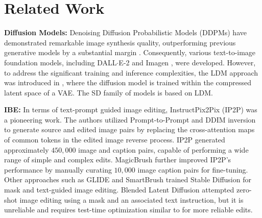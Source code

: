 \section{Related Work}
\label{sec:relatedwork}
\textbf{Diffusion Models:} Denoising Diffusion Probabilistic Models (DDPMs) \cite{ddpm_ho_neurips2020} have demonstrated remarkable image synthesis quality, outperforming previous generative models by a substantial margin \cite{diffusion_beats_gans_neurips2021}. Consequently, various text-to-image foundation models, including DALL$\cdot$E-2 \cite{dalle2_arxiv2022} and Imagen \cite{imagen_neurips2022}, were developed. However, to address the significant training and inference complexities, the LDM approach was introduced in \cite{stablediffusion_cvpr2022}, where the diffusion model is trained within the compressed latent space of a VAE. The SD family of models \cite{stablediffusion_cvpr2022, sdxl_arxiv2023} is based on LDM.

\textbf{IBE:} In terms of text-prompt guided image editing, InstructPix2Pix (IP2P) \cite{ip2p_cvpr2023} was a pioneering work. The authors utilized Prompt-to-Prompt \cite{p2p_iclr2023} and DDIM inversion \cite{ddim_inversion_iclr2021} to generate source and edited image pairs by replacing the cross-attention maps of common tokens in the edited image reverse process. IP2P \cite{ip2p_cvpr2023} generated approximately $450,000$ image and caption pairs, capable of performing a wide range of simple and complex edits. MagicBrush \cite{magicbrush_neurips2023} further improved IP2P's performance by manually curating $10,000$ image caption pairs for fine-tuning. Other approaches such as GLIDE \cite{glide_icml2022} and SmartBrush \cite{smartbrush_cvpr2023} trained Stable Diffusion \cite{stablediffusion_cvpr2022} for mask and text-guided image editing. Blended Latent Diffusion \cite{blended_latent_diffusion_siggraph2023} attempted zero-shot image editing using a mask and an associated text instruction, but it is unreliable and requires test-time optimization similar to \cite{blended_diffusion_cvpr2022} for more reliable edits.
